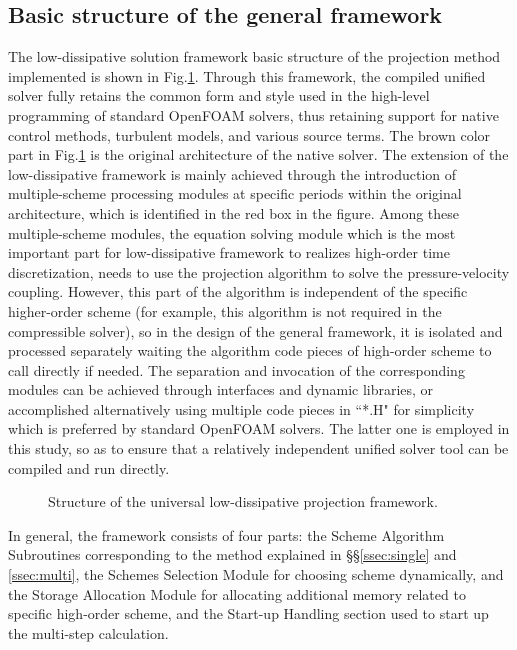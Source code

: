 \documentclass{article}
\begin{document}
\subsection{Basic structure of the general framework}

The low-dissipative solution framework basic structure of the projection method implemented is shown in Fig.\ref{fig:structure}. Through this framework, the compiled unified solver fully retains the common form and style used in the high-level programming of standard OpenFOAM solvers, thus retaining support for native control methods, turbulent models, and various source terms. The brown color part in Fig.\ref{fig:structure} is the original architecture of the native solver. The extension of the low-dissipative framework is mainly achieved through the introduction of multiple-scheme processing modules at specific periods within the original architecture, which is identified in the red box in the figure. Among these multiple-scheme modules, the equation solving module which is the most important part for low-dissipative framework to realizes high-order time discretization, needs to use the projection algorithm to solve the pressure-velocity coupling. However, this part of the algorithm is independent of the specific higher-order scheme (for example, this algorithm is not required in the compressible solver), so in the design of the general framework, it is isolated and processed separately waiting the algorithm code pieces of high-order scheme to call directly if needed. The separation and invocation of the corresponding modules can be achieved through interfaces and dynamic libraries, or accomplished alternatively using multiple code pieces in ``*.H" for simplicity which is preferred by standard OpenFOAM solvers. The latter one is employed in this study, so as to ensure that a relatively independent unified solver tool can be compiled and run directly.

\begin{figure}
	\centering
	\caption{Structure of the universal low-dissipative projection framework.}
	\label{fig:structure}
\end{figure}

In general, the framework consists of four parts: the Scheme Algorithm Subroutines corresponding to the method explained in \S\S\ref{ssec:single} and \ref{ssec:multi}, the Schemes Selection Module for choosing scheme dynamically, and the Storage Allocation Module for allocating additional memory related to specific high-order scheme, and the Start-up Handling section used to start up the multi-step calculation.
\end{document}
